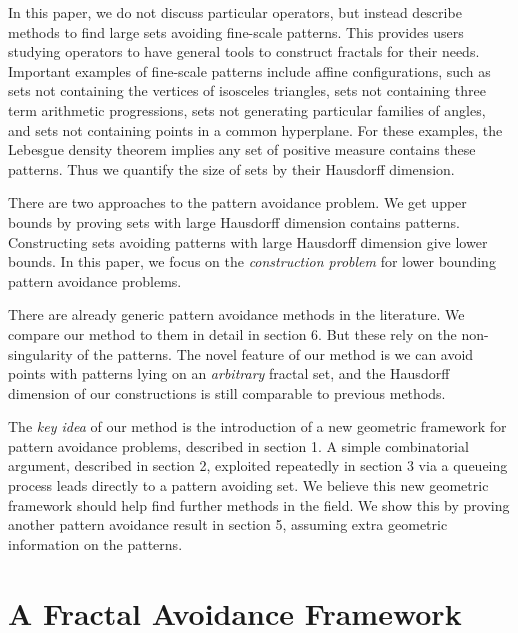 \documentclass{article}
\theoremstyle{plain}
\theoremstyle{plain}
\begin{document}
In this paper, we do not discuss particular operators, but instead describe methods to find large sets avoiding fine-scale patterns. This provides users studying operators to have general tools to construct fractals for their needs. Important examples of fine-scale patterns include affine configurations, such as sets not containing the vertices of isosceles triangles, sets not containing three term arithmetic progressions, sets not generating particular families of angles, and sets not containing points in a common hyperplane. For these examples, the Lebesgue density theorem implies any set of positive measure contains these patterns. Thus we quantify the size of sets by their Hausdorff dimension.

There are two approaches to the pattern avoidance problem. We get upper bounds by proving sets with large Hausdorff dimension contains patterns. Constructing sets avoiding patterns with large Hausdorff dimension give lower bounds. In this paper, we focus on the {\it construction problem} for lower bounding pattern avoidance problems.

There are already generic pattern avoidance methods in the literature. We compare our method to them in detail in section 6. But these rely on the non-singularity of the patterns. The novel feature of our method is we can avoid points with patterns lying on an {\it arbitrary} fractal set, and the Hausdorff dimension of our constructions is still comparable to previous methods.

The {\it key idea} of our method is the introduction of a new geometric framework for pattern avoidance problems, described in section 1. A simple combinatorial argument, described in section 2, exploited repeatedly in section 3 via a queueing process leads directly to a pattern avoiding set. We believe this new geometric framework should help find further methods in the field. We show this by proving another pattern avoidance result in section 5, assuming extra geometric information on the patterns.

\section{A Fractal Avoidance Framework}
\end{document}

